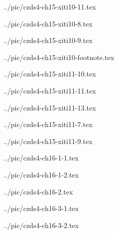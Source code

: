 ../pic/czds4-ch15-xiti10-11.tex



../pic/czds4-ch15-xiti10-8.tex



../pic/czds4-ch15-xiti10-9.tex



../pic/czds4-ch15-xiti10-footnote.tex



../pic/czds4-ch15-xiti11-10.tex



../pic/czds4-ch15-xiti11-11.tex



../pic/czds4-ch15-xiti11-13.tex



../pic/czds4-ch15-xiti11-7.tex



../pic/czds4-ch15-xiti11-9.tex



../pic/czds4-ch16-1-1.tex



../pic/czds4-ch16-1-2.tex



../pic/czds4-ch16-2.tex



../pic/czds4-ch16-3-1.tex



../pic/czds4-ch16-3-2.tex

